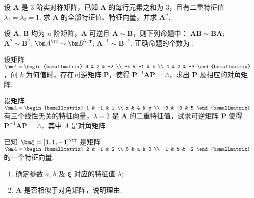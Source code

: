 	\begin{titwo}
		设 $\bm A$ 是 $3$ 阶实对称矩阵，已知 $\bm A$ 的每行元素之和为 $3$，且有二重特征值 $\lambda_{1} = \lambda_{2} = 1$. 求 $\bm A$ 的全部特征值、特征向量，并求 $\bm A^{n}$.
	\end{titwo}

	\begin{titwo}
		设 $\bm A$, $\bm B$ 均为 $n$ 阶矩阵，$\bm A$ 可逆且 $\bm A \sim \bm B$，则下列命题中： $\bm A \bm B \sim \bm B \bm A$;  $\bm A^{2} \sim \bm B^{2}$;  $\bm A^{\TT} \sim \bm B^{\TT}$;  $\bm A^{-1} \sim \bm B^{-1}$. 正确命题的个数为 \kuo.

	\end{titwo}

	\begin{titwo}
		设矩阵 $\bm A = \begin{bsmallmatrix}
			3 & 2 & -2 \\
			-k & -1 & k \\
			4 & 2 & -3
		\end{bsmallmatrix}$，问 $k$ 为何值时，存在可逆矩阵 $\bm P$，使得 $\bm P^{-1} \bm A \bm P = \bm \varLambda$，求出 $\bm P$ 及相应的对角矩阵.
	\end{titwo}

	\begin{titwo}
		设矩阵 $\bm A = \begin{bsmallmatrix}
			1 & -1 & 1 \\
			x & 4 & y \\
			-3 & -3 & 5
		\end{bsmallmatrix}$ 有三个线性无关的特征向量，$\lambda = 2$ 是 $\bm A$ 的二重特征值，试求可逆矩阵 $\bm P$ 使得 $\bm P^{-1} \bm A \bm P = \bm \varLambda$，其中 $\bm \varLambda$ 是对角矩阵.
	\end{titwo}

	\begin{titwo}
		已知 $\bm \xi = [1,1,-1]^{\TT}$ 是矩阵 $\bm A = \begin{bsmallmatrix}
			2 & -1 & 2 \\
			5 & a & 3 \\
			-1 & b & -2
		\end{bsmallmatrix}$ 的一个特征向量.
		\begin{enumerate}
			\item 确定参数 $a$, $b$ 及 $\bm \xi$ 对应的特征值 $\lambda$;
			\item $\bm A$ 是否相似于对角矩阵，说明理由.
		\end{enumerate}
	\end{titwo}
